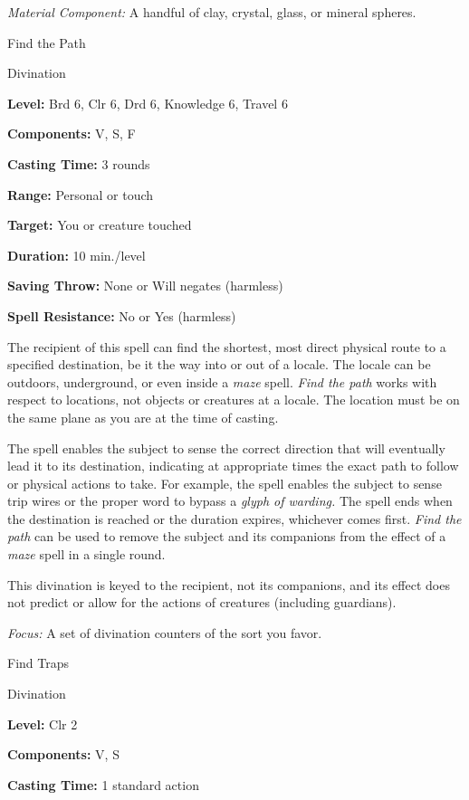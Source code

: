 \documentclass{article}
\begin{document}
\textit{Material Component: }A handful of clay, crystal, glass, or mineral spheres.

\vspace{12pt}
Find the Path

Divination

\textbf{Level:} Brd 6, Clr 6, Drd 6, Knowledge 6, Travel 6

\textbf{Components:} V, S, F

\textbf{Casting Time:} 3 rounds

\textbf{Range:} Personal or touch

\textbf{Target:} You or creature touched

\textbf{Duration:} 10 min./level

\textbf{Saving Throw:} None or Will negates (harmless)

\textbf{Spell Resistance:} No or Yes (harmless)

The recipient of this spell can find the shortest, most direct physical route to 
a specified destination, be it the way into or out of a locale. The locale can 
be outdoors, underground, or even inside a \textit{maze }spell. \textit{Find the 
path }works with respect to locations, not objects or creatures at a locale. The 
location must be on the same plane as you are at the time of casting.

The spell enables the subject to sense the correct direction that will eventually 
lead it to its destination, indicating at appropriate times the exact path to follow 
or physical actions to take. For example, the spell enables the subject to sense 
trip wires or the proper word to bypass a \textit{glyph of warding. }The spell 
ends when the destination is reached or the duration expires, whichever comes first. 
\textit{Find the path }can be used to remove the subject and its companions from 
the effect of a \textit{maze }spell in a single round.

This divination is keyed to the recipient, not its companions, and its effect does 
not predict or allow for the actions of creatures (including guardians).

\textit{Focus: }A set of divination counters of the sort you favor.

\vspace{12pt}
Find Traps

Divination

\textbf{Level:} Clr 2

\textbf{Components:} V, S

\textbf{Casting Time:} 1 standard action
\end{document}
